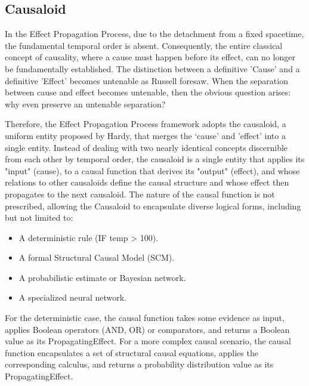 %
%
\subsection{Causaloid}
\label{sec:epp_causaloid}

In the Effect Propagation Process, due to the detachment from a fixed spacetime, the fundamental temporal order is absent. Consequently, the entire classical concept of causality, where a cause must happen before its effect, can no longer be fundamentally established. The distinction between a definitive 'Cause' and a definitive 'Effect' becomes untenable as Russell foresaw. When the separation between cause and effect becomes untenable, then the obvious question arises: why even preserve an untenable separation?

Therefore, the Effect Propagation Process framework adopts the causaloid, a uniform entity proposed by Hardy\cite{HardyDynamicCausalStructure}, that merges the ‘cause' and 'effect' into a single entity. Instead of dealing with two nearly identical concepts discernible from each other by temporal order, the causaloid is a single entity that applies its "input" (cause), to a causal function that derives its "output" (effect), and whose relations to other causaloids define the causal structure and whose effect then propagates to the next causaloid. The nature of the causal function is not prescribed, allowing the Causaloid to encapsulate diverse logical forms, including but not limited to:

\begin{itemize}
	\item A deterministic rule (IF temp > 100).
 	\item A formal Structural Causal Model (SCM).
	\item A probabilistic estimate or Bayesian network.
	\item A specialized neural network.
\end{itemize}

For the deterministic case, the causal function takes some evidence as input, applies Boolean operators (AND, OR) or comparators, and returns a Boolean value as its PropagatingEffect. For a more complex causal scenario, the causal function encapsulates a set of structural causal equations,
applies the corresponding calculus, and returns a probability distribution value as its PropagatingEffect.

